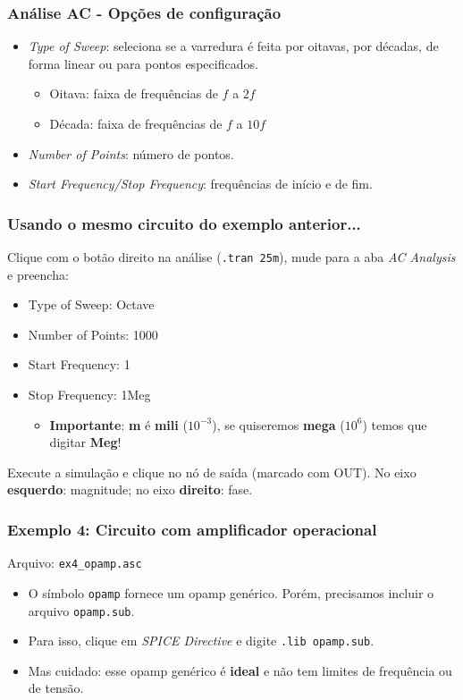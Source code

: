 \documentclass{beamer}
\begin{document}
\begin{frame}
\frametitle{Análise AC - Opções de configuração}
\begin{itemize}
\item{\textit{Type of Sweep}}: seleciona se a varredura é feita por oitavas, por décadas, de forma linear ou para pontos especificados.
\begin{itemize}
\item{Oitava}: faixa de frequências de $f$ a $2 f$
\item{Década}: faixa de frequências de $f$ a $10 f$
\end{itemize}
\item{\textit{Number of Points}}: número de pontos.
\item{\textit{Start Frequency/Stop Frequency}}: frequências de início e de fim.
\end{itemize}
\end{frame}

\begin{frame}
\frametitle{Usando o mesmo circuito do exemplo anterior...}
Clique com o botão direito na análise (\texttt{.tran 25m}), mude para a aba \textit{AC Analysis} e preencha:
\begin{itemize}

\item{Type of Sweep}: Octave
\item{Number of Points}: 1000
\item{Start Frequency}: 1
\item{Stop Frequency}: 1Meg
\begin{itemize}
\item{\textbf{Importante}}: \textbf{m} é \textbf{mili} ($10^{-3}$), se quiseremos \textbf{mega} ($10^6$) temos que digitar \textbf{Meg}!
\end{itemize}
\end{itemize}
Execute a simulação e clique no nó de saída (marcado com OUT). No eixo \textbf{esquerdo}: magnitude; no eixo \textbf{direito}: fase.
\end{frame}

\begin{frame}
\frametitle{Exemplo 4: Circuito com amplificador operacional}
Arquivo: \texttt{ex4\_opamp.asc}
\begin{itemize}
\item{O símbolo \texttt{opamp} fornece um opamp genérico. Porém, precisamos incluir o arquivo \texttt{opamp.sub}.}
\item{Para isso, clique em \textit{SPICE Directive} e digite \texttt{.lib opamp.sub}}.
\item{Mas cuidado: esse opamp genérico é \textbf{ideal} e não tem limites de frequência ou de tensão.}
\end{itemize}
\end{frame}
\end{document}

